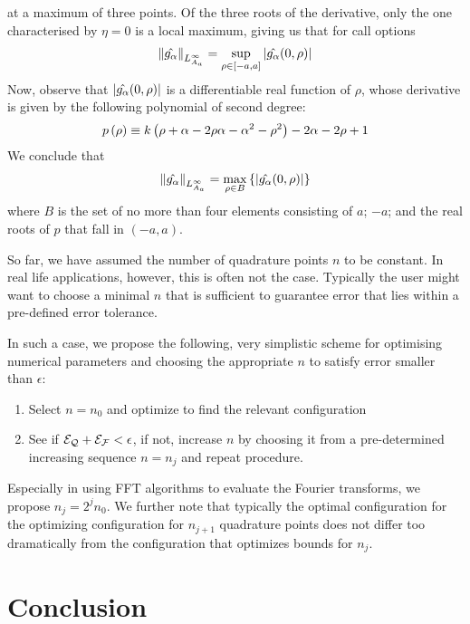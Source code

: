 \documentclass[11pt]{amsart}
\begin{document}
at a maximum of three points. Of the three roots of the derivative, only the one characterised
by $\eta=0$ is a local maximum, giving us that for call options
\begin{align}
\left\|\hat{g_{\alpha}}\right\|_{L^\infty_{A_{a}}} = \sup_{\rho \in [-a,a]} \left| {\hat{g_{\alpha}}(0,\rho)} \right| 
\label{eq:complexsup}
\end{align}
Now, observe that $\left| {\hat{g_{\alpha}}(0,\rho)} \right|$ is a differentiable real function of $\rho$, whose derivative is given by the following polynomial of second degree:
\begin{align}
 p \left( {\rho} \right) \equiv k \left( {\rho +\alpha - 2 \rho \alpha - \alpha^2 - \rho^2} \right)
 - 2 \alpha - 2 \rho +1
\end{align}
We conclude that
\begin{align}
\left\|\hat{g_{\alpha}}\right\|_{L^\infty_{A_{a}}} = \max_{\rho \in B} \left\{ \left| {\hat{g_{\alpha}}(0,\rho)} \right|\right\} 
\label{eq:complexsup2}
\end{align}
where $B$ is the set of no more than four elements consisting of $a$; $-a$; and the real roots of $p$ that fall in $(-a,a)$.

\begin{remark}
So far, we have assumed the number of quadrature points $n$ to be constant.
In real life applications, however, this is often not the case. Typically the user might want to choose a minimal
$n$ that is sufficient to guarantee error that lies within a pre-defined error tolerance.

In such a case, we propose the following, very simplistic scheme for optimising numerical parameters
and choosing the appropriate $n$ to satisfy error smaller than $\epsilon$:
\begin{enumerate}
\item Select $n=n_0$ and optimize to find the relevant configuration
\item See if $\mathcal{E_Q} + \mathcal{E_F} <\epsilon$, if not, increase $n$ by choosing it from a pre-determined
increasing sequence $n=n_j$ and repeat procedure.
\end{enumerate}
Especially in using FFT algorithms to evaluate the Fourier transforms,
we propose $n_j = 2^j n_0$. We further note that typically the optimal configuration
for the optimizing configuration for $n_{j+1}$ quadrature points does not differ too
dramatically from the configuration that optimizes bounds for $n_j$.
\end{remark}


\section{Conclusion}
\label{section:Conclusion}
\end{document}
